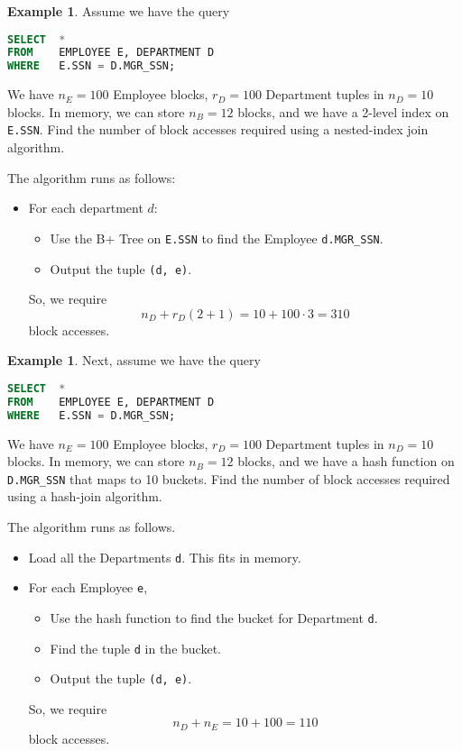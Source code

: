 \documentclass[a4paper, openany]{memoir}
\theoremstyle{definition}
\newtheorem{example}[subsection]{Example}
\begin{document}
\begin{example}
    Assume we have the query
\begin{lstlisting}[language=SQL]
SELECT  *
FROM    EMPLOYEE E, DEPARTMENT D
WHERE   E.SSN = D.MGR_SSN;
\end{lstlisting}
    We have $n_E = 100$ Employee blocks, $r_D = 100$ Department tuples in $n_D = 10$ blocks. In memory, we can store $n_B = 12$ blocks, and we have a 2-level index on \texttt{E.SSN}. Find the number of block accesses required using a nested-index join algorithm.
\end{example}
\begin{answer}
    The algorithm runs as follows:
    \begin{itemize}
        \item For each department $d$:
        \begin{itemize}
            \item Use the B+ Tree on \texttt{E.SSN} to find the Employee \texttt{d.MGR\_SSN}.
            \item Output the tuple \texttt{(d, e)}.
        \end{itemize}
        So, we require
        \[n_D + r_D (2 + 1) = 10 + 100 \cdot 3 = 310\]
        block accesses.
    \end{itemize}
\end{answer}
 
\begin{example}
    Next, assume we have the query
\begin{lstlisting}[language=SQL]
SELECT  *
FROM    EMPLOYEE E, DEPARTMENT D
WHERE   E.SSN = D.MGR_SSN;
\end{lstlisting}
    We have $n_E = 100$ Employee blocks, $r_D = 100$ Department tuples in $n_D = 10$ blocks. In memory, we can store $n_B = 12$ blocks, and we have a hash function on \texttt{D.MGR\_SSN} that maps to 10 buckets. Find the number of block accesses required using a hash-join algorithm.
\end{example}
\begin{answer}
    The algorithm runs as follows.
    \begin{itemize}
        \item Load all the Departments \texttt{d}. This fits in memory.
        \item For each Employee \texttt{e},
        \begin{itemize}
            \item Use the hash function to find the bucket for Department \texttt{d}.
            \item Find the tuple \texttt{d} in the bucket.
            \item Output the tuple \texttt{(d, e)}.
        \end{itemize}
        So, we require
        \[n_D + n_E = 10 + 100 = 110\]
        block accesses.        
    \end{itemize}
\end{answer}
\end{document}
